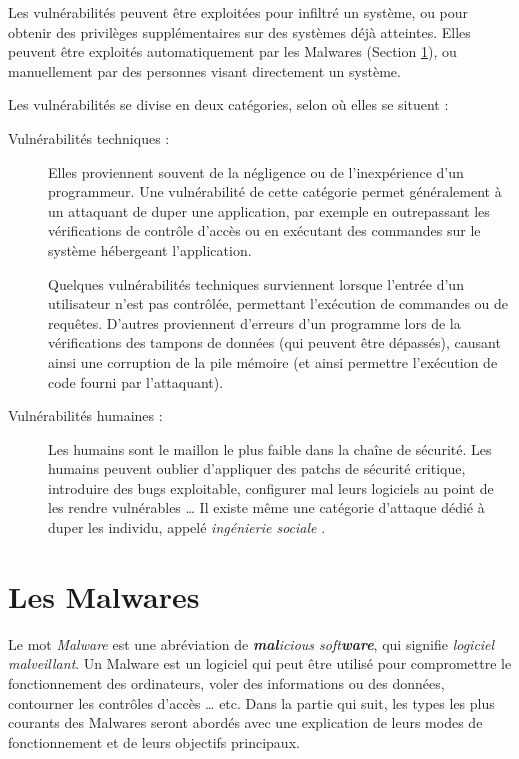     Les vulnérabilités peuvent être exploitées pour infiltré un système, ou pour obtenir des privilèges supplémentaires
    sur des systèmes déjà atteintes. Elles peuvent être exploités automatiquement par les Malwares 
    (Section \ref{malwares}), ou manuellement par des personnes visant directement un système.

    Les vulnérabilités se divise en deux catégories, selon où elles se situent :
    
    \begin{description}
        \item[Vulnérabilités techniques :] Elles proviennent souvent de la négligence ou de l'inexpérience d'un 
            programmeur. Une vulnérabilité de cette catégorie permet généralement à un attaquant de duper 
            une application, par exemple en outrepassant les vérifications de contrôle d'accès ou en exécutant
            des commandes sur le système hébergeant l'application.

            Quelques vulnérabilités techniques surviennent lorsque l'entrée d'un utilisateur n'est pas contrôlée,
            permettant l'exécution de commandes ou de requêtes. D'autres proviennent d'erreurs d'un programme
            lors de la vérifications des tampons de données (qui peuvent être dépassés), 
            causant ainsi une corruption de la pile mémoire
            (et ainsi permettre l'exécution de code fourni par l'attaquant). \cite{vulnerabilites}

        \item[Vulnérabilités humaines :] Les humains sont le maillon le plus faible dans la chaîne de sécurité.
            Les humains peuvent oublier d'appliquer des patchs de sécurité critique, introduire des bugs
            exploitable, configurer mal leurs logiciels au point de les rendre vulnérables \ldots{}
            Il existe même une catégorie d'attaque dédié à duper les individu, appelé \emph{ingénierie sociale} 
            \cite{bases_hacking}.
    \end{description}

\section{Les Malwares} \label{malwares}
    Le mot \emph{Malware} est une abréviation de \emph{\textbf{mal}icious soft\textbf{ware}}, qui signifie 
    \emph{logiciel malveillant}. Un Malware est un logiciel qui peut être utilisé pour compromettre le
    fonctionnement des ordinateurs, voler des informations ou des données, contourner les contrôles d'accès
    \ldots{} etc. Dans la partie qui suit, les types les plus courants des Malwares seront abordés avec une explication 
    de leurs modes de fonctionnement et de leurs objectifs principaux. \cite{malware_types}%

